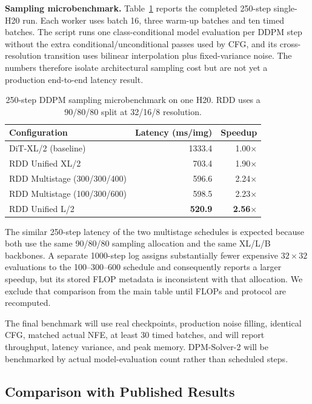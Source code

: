 \documentclass[10pt]{article}
\begin{document}
\textbf{Sampling microbenchmark.}
Table~\ref{tab:speed} reports the completed 250-step single-H20 run.
Each worker uses batch 16, three warm-up batches and ten timed batches.
The script runs one class-conditional model evaluation per DDPM step without the extra conditional/unconditional passes used by CFG, and its cross-resolution transition uses bilinear interpolation plus fixed-variance noise.
The numbers therefore isolate architectural sampling cost but are not yet a production end-to-end latency result.

\begin{table}[h]
\centering
\caption{250-step DDPM sampling microbenchmark on one H20. RDD uses a 90/80/80 split at 32/16/8 resolution.}
\label{tab:speed}
\small
\begin{tabular}{@{}lrr@{}}
\toprule
\textbf{Configuration} & \textbf{Latency (ms/img)} & \textbf{Speedup} \\
\midrule
DiT-XL/2 (baseline) & 1333.4 & 1.00$\times$ \\
RDD Unified XL/2 & 703.4 & 1.90$\times$ \\
RDD Multistage (300/300/400) & 596.6 & 2.24$\times$ \\
RDD Multistage (100/300/600) & 598.5 & 2.23$\times$ \\
RDD Unified L/2 & \textbf{520.9} & \textbf{2.56$\times$} \\
\bottomrule
\end{tabular}
\end{table}

The similar 250-step latency of the two multistage schedules is expected because both use the same 90/80/80 sampling allocation and the same XL/L/B backbones.
A separate 1000-step log assigns substantially fewer expensive $32\times32$ evaluations to the 100--300--600 schedule and consequently reports a larger speedup, but its stored FLOP metadata is inconsistent with that allocation.
We exclude that comparison from the main table until FLOPs and protocol are recomputed.

The final benchmark will use real checkpoints, production noise filling, identical CFG, matched actual NFE, at least 30 timed batches, and will report throughput, latency variance, and peak memory.
DPM-Solver-2 will be benchmarked by actual model-evaluation count rather than scheduled steps.

\subsection{Comparison with Published Results}
\label{sec:published}
\end{document}
